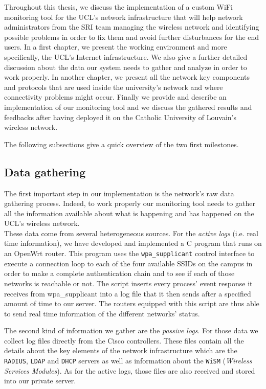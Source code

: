 Throughout this thesis, we discuss the implementation of a custom WiFi monitoring tool for the UCL's network infrastructure that will help network administrators from the SRI team managing the wireless network and identifying possible problems in order to fix them and avoid further disturbances for the end users. In a first chapter, we present the working environment and more specifically, the UCL's Internet infrastructure. We also give a further detailed discussion about the data our system needs to gather and analyze in order to work properly. In another chapter, we present all the network key components and protocols that are used inside the university's network and where connectivity problems might occur. Finally we provide and describe an implementation of our monitoring tool and we discuss the gathered results and feedbacks after having deployed it on the Catholic University of Louvain's wireless network.

The following subsections give a quick overview of the two first milestones.


\subsection{Data gathering}
The first important step in our implementation is the network's raw data gathering process. Indeed, to work properly our monitoring tool needs to gather all the information available about what is happening and has happened on the UCL's wireless network.\\
These data come from several heterogeneous sources. For the \textit{active logs} (i.e. real time information), we have developed and implemented a C program that runs on an OpenWrt router. This program uses the \texttt{wpa\_supplicant} control interface to execute a connection loop to each of the four available SSIDs on the campus in order to make a complete authentication chain and to see if each of those networks is reachable or not. The script inserts every process' event response it receives from wpa\_supplicant into a log file that it then sends after a specified amount of time to our server. The routers equipped with this script are thus able to send real time information of the different networks' status.

The second kind of information we gather are the \textit{passive logs}. For those data we collect log files directly from the Cisco controllers. These files contain all the details about the key elements of the network infrastructure which are the \texttt{RADIUS}, \texttt{LDAP} and \texttt{DHCP} servers as well as information about the \texttt{WiSM} (\textit{Wireless Services Modules}). As for the active logs, those files are also received and stored into our private server.



